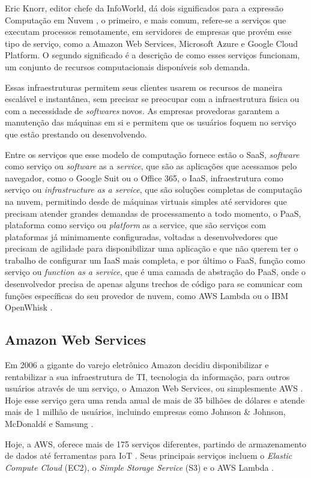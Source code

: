 \indent
\par Eric Knorr, editor chefe da InfoWorld, dá dois significados para a expressão Computação em Nuvem \cite{CloudComp}, o primeiro, e mais comum, refere-se a serviços que executam processos remotamente, em servidores de empresas que provém esse tipo de serviço, como a Amazon Web Services, Microsoft Azure e Google Cloud Platform. O segundo significado é a descrição de como esses serviços funcionam, um conjunto de recursos computacionais disponíveis sob demanda. 
\indent
\par Essas infraestruturas permitem seus clientes usarem os recursos de maneira escalável e instantânea, sem precisar se preocupar com a infraestrutura física ou com a necessidade de \textit{softwares} novos. As empresas provedoras garantem a manutenção das máquinas em si e permitem que os usuários foquem no serviço que estão prestando ou desenvolvendo.
\indent
\par Entre os serviços que esse modelo de computação fornece estão o SaaS, \textit{software} como serviço ou \textit{software} as a \textit{service}, que são as aplicações que acessamos pelo navegador, como o Google Suit ou o Office 365, o IaaS, infraestrutura como serviço ou \textit{infrastructure as a service}, que são soluções completas de computação na nuvem, permitindo desde de máquinas virtuais simples até servidores que precisam atender grandes demandas de processamento a todo momento, o PaaS, plataforma como serviço ou \textit{platform} as a service, que são serviços com plataformas já minimamente configuradas, voltadas a desenvolvedores que precisam de agilidade para disponibilizar uma aplicação e que não querem ter o trabalho de configurar um IaaS mais completa, e por último o FaaS, função como serviço ou \textit{function as a service}, que é uma camada de abstração do PaaS, onde o desenvolvedor precisa de apenas alguns trechos de código para se comunicar com funções específicas do seu provedor de nuvem, como AWS Lambda ou o IBM OpenWhisk \cite{CloudComp}.

\subsection{Amazon Web Services}

\indent
\par Em 2006 a gigante do varejo eletrônico Amazon decidiu disponibilizar e rentabilizar a sua infraestrutura de TI, tecnologia da informação, para outros usuários através de um serviço, o Amazon Web Services, ou simplesmente AWS \cite{AmazonAWSAbout}. Hoje esse serviço gera uma renda anual de mais de 35 bilhões de dólares \cite{DevelpAmazonWeb} e atende mais de 1 milhão de usuários, incluindo empresas como Johnson \& Johnson, McDonald\'s e Samsung \cite{WhosUsingAWS}.
\indent
\par Hoje, a AWS, oferece mais de 175 serviços diferentes, partindo de armazenamento de dados até ferramentas para IoT \cite{TopTenAWS}. Seus principais serviços incluem o \textit{Elastic Compute Cloud} (EC2), o \textit{Simple Storage Service} (S3) e o AWS Lambda \cite{TechRadar}.

